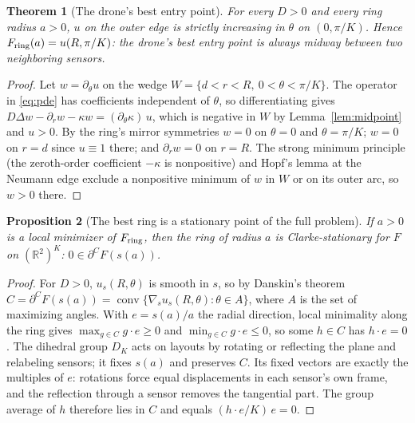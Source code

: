 \documentclass[11pt]{article}
\newtheorem{theorem}{Theorem}
\newtheorem{proposition}[theorem]{Proposition}
\theoremstyle{remark}
\newcommand{\R}{\mathbb{R}}
\begin{document}
\begin{theorem}[The drone's best entry point]\label{thm:midpoint}
For every $D>0$ and every ring radius $a>0$, $u$ on the outer edge is strictly increasing in
$\theta$ on $(0,\pi/K)$. Hence $F_{\rm ring}(a)=u(R,\pi/K)$: the drone's best entry point is
always midway between two neighboring sensors.
\end{theorem}
\begin{proof}
Let $w=\partial_\theta u$ on the wedge $W=\{d<r<R,\ 0<\theta<\pi/K\}$. The operator in
\eqref{eq:pde} has coefficients independent of $\theta$, so differentiating gives
$D\Delta w-\partial_r w-\kappa w=(\partial_\theta\kappa)\,u$, which is negative in $W$ by
Lemma~\ref{lem:midpoint} and $u>0$. By the ring's mirror symmetries $w=0$ on $\theta=0$ and
$\theta=\pi/K$; $w=0$ on $r=d$ since $u\equiv1$ there; and $\partial_r w=0$ on $r=R$. The
strong minimum principle (the zeroth-order coefficient $-\kappa$ is nonpositive) and Hopf's
lemma at the Neumann edge exclude a nonpositive minimum of $w$ in $W$ or on its outer arc, so
$w>0$ there.
\end{proof}

\begin{proposition}[The best ring is a stationary point of the full problem]
\label{prop:clarke}
If $a>0$ is a local minimizer of $F_{\rm ring}$, then the ring of radius $a$ is
Clarke-stationary for $F$ on $(\R^2)^K$: $0\in\partial^C F(s(a))$.
\end{proposition}
\begin{proof}
For $D>0$, $u_s(R,\theta)$ is smooth in $s$, so by Danskin's theorem
$C=\partial^CF(s(a))=\operatorname{conv}\{\nabla_s u_s(R,\theta):\theta\in A\}$, where $A$ is
the set of maximizing angles. With $e=s(a)/a$ the radial direction, local minimality along
the ring gives $\max_{g\in C}g\cdot e\ge0$ and $\min_{g\in C}g\cdot e\le0$, so some $h\in C$
has $h\cdot e=0$. The dihedral group $D_K$ acts on layouts by rotating or reflecting the plane
and relabeling sensors; it fixes $s(a)$ and preserves $C$. Its fixed vectors are exactly the
multiples of $e$: rotations force equal displacements in each sensor's own frame, and the
reflection through a sensor removes the tangential part. The group average of $h$ therefore
lies in $C$ and equals $(h\cdot e/K)\,e=0$.
\end{proof}
\end{document}
